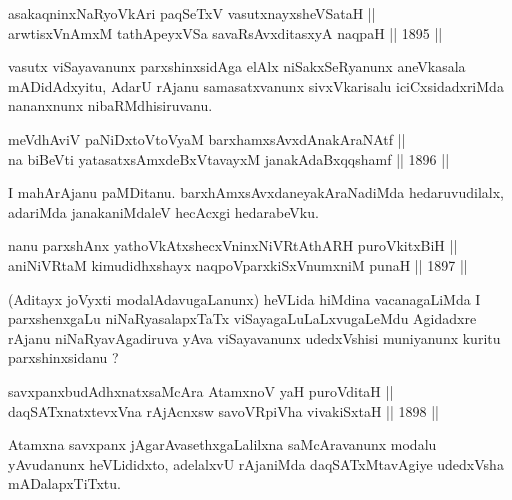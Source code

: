 \begin{shl}
asakaqninxNaRyoV\s kAri paqSeTxV vasutxnayxsheVSataH || \\
arwtisxVnAmxM tathA\s peyxVSa savaRsAvxditasxyA naqpaH \hfill || 1895 ||
  
\end{shl}

\begin{artha}
vasutx viSayavanunx parxshinxsidAga elAlx niSakxSeRyanunx aneVkasala
mADidAdxyitu, AdarU rAjanu samasatxvanunx sivxVkarisalu
iciCxsidadxriMda nananxnunx nibaRMdhisiruvanu.
\end{artha}

\begin{shl}
meVdhAviV paNiDxtoV\s toV\s yaM barxhamxsAvxdAnakAraNAtf || \\
na biBeVti yatasatxsAmxdeBxVtavayxM janakAdaBxqqshamf \hfill || 1896 ||
  
\end{shl}

\begin{artha}
I mahArAjanu paMDitanu. barxhAmxsAvxdaneyakAraNadiMda hedaruvudilalx,
adariMda janakaniMdaleV hecAcxgi hedarabeVku.
\end{artha}


\begin{shl}
nanu parxshAnx yathoVkAtxshecxVninxNiVRtAthARH puroVkitxBiH || \\
aniNiVRtaM kimudidhxshayx naqpoV\s parxkiSxVnumxniM punaH \hfill || 1897 ||
  
\end{shl} 

\begin{artha}
(Aditayx joVyxti modalAdavugaLanunx) heVLida hiMdina vacanagaLiMda I
parxshenxgaLu niNaRyasalapxTaTx viSayagaLuLaLxvugaLeMdu Agidadxre
rAjanu niNaRyavAgadiruva yAva viSayavanunx udedxVshisi muniyanunx
kuritu parxshinxsidanu ?
\end{artha}


\begin{shl}
savxpanxbudAdhxnatxsaMcAra AtamxnoV yaH puroVditaH || \\
daqSATxnatxtevxVna rAjAcnx\s sw savoVR\s piVha vivakiSxtaH \hfill || 1898 ||
  
\end{shl}

\begin{artha}
Atamxna savxpanx jAgarAvasethxgaLalilxna saMcAravanunx modalu
yAvudanunx heVLididxto, adelalxvU rAjaniMda daqSATxMtavAgiye udedxVsha
mADalapxTiTxtu.
\end{artha}

